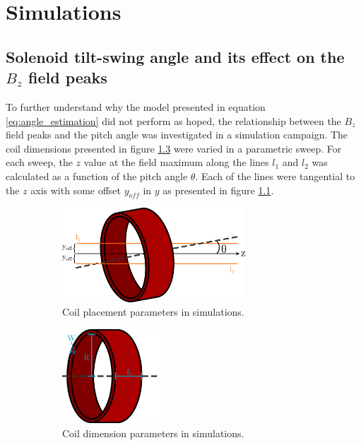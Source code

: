 \chapter{Simulations}

\section{Solenoid tilt-swing angle and its effect on the $B_z$ field peaks}
\label{sec:simulations}

To further understand why the model presented in equation
\ref{eq:angle_estimation} did not perform as hoped, the relationship
between the $B_z$ field peaks and the pitch angle was investigated in
a simulation campaign. The coil dimensions presented in figure
\ref{fig:sim-mag-dims} were varied in a parametric sweep.
For each sweep, the $z$ value at the field maximum along the lines $l_1$ and $l_2$
was calculated as a function of the pitch angle $\theta$. Each
of the lines were tangential to the $z$ axis with some offset
$y_{off}$ in $y$ as presented in figure \ref{fig:sim-mag-rot}.

\begin{figure}[h!]
    \centering
    \begin{subfigure}[b]{0.4\textwidth}
        \centering
        \includegraphics[height=100pt]{figs/sim_mag_rot}
        \caption{Coil placement parameters in simulations.}
        \label{fig:sim-mag-rot}
    \end{subfigure}
    \hfill
    \begin{subfigure}[b]{0.4\textwidth}
        \centering
        \includegraphics[height=100pt]{figs/sim_mag_dims}
        \caption{Coil dimension parameters in simulations.}
        \label{fig:sim-mag-dims}
    \end{subfigure}
    \caption{}
\end{figure}

